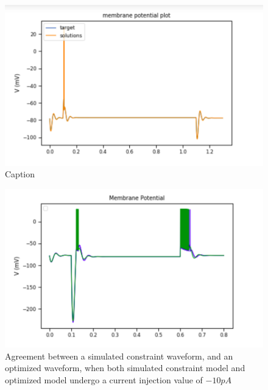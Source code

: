 

\begin{figure}
    \centering
    \includegraphics{figures/simulated_data_supra_threshold.png}
    \caption{Caption}
    \label{fig:my_label}
\end{figure}
\begin{figure}
    \centering
    \includegraphics{figures/simulated_data_sub_threshold.png}
    \caption{Agreement between a simulated constraint waveform, and an optimized waveform, when both simulated constraint model and optimized model undergo a current injection value of $-10pA$}
    \label{fig:my_label}
\end{figure}
